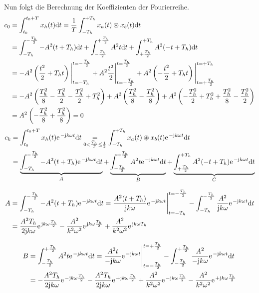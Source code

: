 \documentclass[11pt,a4paper,DIV=12]{scrartcl}
\begin{document}
%
%
Nun folgt die Berechnung der Koeffizienten der Fourierreihe.
%
%
%
\begin{align}
	c_0&=\int_{t_0}^{t_0+T}x_{h}(t)\mathrm{d} t=\frac{1}{T}\int_{-T_h}^{+T_h}x_{a}(t)\circledast x_{b}(t)\mathrm{d} t \nonumber \\
	&=\int_{-T_h}^{-\frac{T_h}{2}}-A^2(t+T_h)\mathrm{d} t+\int_{-\frac{T_h}{2}}^{+\frac{T_h}{2}}A^2t\mathrm{d} t+\int_{+\frac{T_h}{2}}^{+T_h}A^2(-t+T_h)\mathrm{d} t\nonumber \\
	&=-A^2\left(\frac{t^2}{2}+T_ht\right)\Bigg |_{t=-T_h}^{t=-\frac{T_h}{2}}+A^2\frac{t^2}{2}\Bigg |_{t=-\frac{T_h}{2}}^{t=\frac{T_h}{2}} + A^2\left(-\frac{t^2}{2}+T_ht\right)\Bigg |_{t=+\frac{T_h}{2}}^{t=+T_h} \nonumber \\
	&=-A^2\left(\frac{T_h^2}{8}-\frac{T_h^2}{2}-\frac{T_h^2}{2}+T_h^2\right)+A^2\left(\frac{T_h^2}{8}-\frac{T_h^2}{8}\right)+A^2\left(-\frac{T_h^2}{2}+T_h^2+\frac{T_h^2}{8}-\frac{T_h^2}{2}\right) \nonumber \\
	&=A^2\left (-\frac{T_h^2}{8}+\frac{T_h^2}{8}\right )=0
\end{align}
%
%
%
\begin{align}
	c_k&=\int_{t_0}^{t_0+T}x_{h}(t)\e^{-\im k \omega t}\diff t
	\underset{0<\frac{T_h}{T}\leq \frac{1}{2}}{=}\int_{-T_h}^{+T_h}x_{a}(t)\circledast x_{b}(t)\e^{-\im k \omega t}\diff t \nonumber \\
	&=\underbrace{\int_{-T_h}^{-\frac{T_h}{2}}-A^2(t+T_h)\e^{-\im k \omega t}\diff t}_A+\underbrace{\int_{-\frac{T_h}{2}}^{+\frac{T_h}{2}}A^2t\e^{-\im k \omega t}\diff t}_B+\underbrace{\int_{+\frac{T_h}{2}}^{+T_h}A^2(-t+T_h)\e^{-\im k \omega t}\diff t}_C
\end{align}
%

%
\begin{align}
	A&=\int_{-T_h}^{-\frac{T_h}{2}}-A^2(t+T_h)\e^{-\im k \omega t}\diff t=\frac{A^2(t+T_h)}{\im k \omega }\e^{-\im k \omega t}\Bigg |_{t=-T_h}^{t=-\frac{T_h}{2}}-\int_{-T_h}^{-\frac{T_h}{2}}\frac{A^2}{\im k \omega }\e^{-\im k \omega t}\diff t\nonumber \\
	&=\frac{A^2T_h}{2\im k \omega }\e^{\im k \omega \frac{T_h}{2}}-\frac{A^2}{k^2\omega^2}\e^{\im k \omega \frac{T_h}{2}}+\frac{A^2}{k^2\omega^2}\e^{\im k \omega T_h}
\end{align}
%

%
\begin{align}
	B&=\int_{-\frac{T_h}{2}}^{+\frac{T_h}{2}}A^2t\e^{-\im k \omega t}\diff t
	=\frac{A^2t}{-\im k \omega}\e^{-\im k \omega t}\Bigg |_{t=-\frac{T_h}{2}}^{t=+\frac{T_h}{2}}-\int_{-\frac{T_h}{2}}^{+\frac{T_h}{2}}\frac{A^2}{-\im k \omega}\e^{-\im k \omega t}\diff t\nonumber \\
	&=-\frac{A^2T_h}{2\im k \omega}\e^{-\im k \omega \frac{T_h}{2}}-\frac{A^2T_h}{2\im k \omega}\e^{+\im k \omega \frac{T_h}{2}}+\frac{A^2}{k^2\omega^2}\e^{-\im k \omega \frac{T_h}{2}}-\frac{A^2}{ k^2 \omega^2}\e^{+\im k \omega \frac{T_h}{2}}
\end{align}
%
\end{document}
